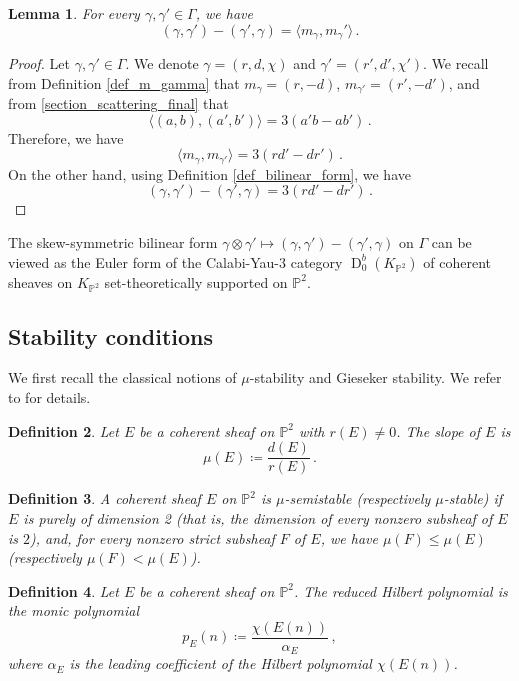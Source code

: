 \documentclass[12pt, a4paper]{amsart}
\newtheorem{defn}{Definition}[section]
\newtheorem{lem}[defn]{Lemma}
\newcommand\PP{\mathbb P}
\newcommand\D{\operatorname{D}}
\begin{document}
\begin{lem} \label{lem_skew_sym_euler_form}
For every $\gamma, \gamma' \in \Gamma$, we have 
\[ (\gamma,\gamma')-(\gamma',\gamma)
=\langle m_\gamma, m_\gamma' \rangle\,.\]
\end{lem}

\begin{proof}
Let $\gamma, \gamma' \in \Gamma$. We denote 
$\gamma=(r,d,\chi)$ and $\gamma'=(r',d',\chi')$. We recall from Definition
\ref{def_m_gamma} that $m_\gamma=(r,-d)$,
$m_{\gamma'}=(r',-d')$, and from
\cref{section_scattering_final} that 
\[\langle (a,b),(a',b')\rangle=3(a'b-ab')\,.\]
Therefore, we have 
\[\langle m_\gamma,m_{\gamma'}\rangle
=3(rd'-dr')\,.\]
On the other hand, using Definition \ref{def_bilinear_form}, we have 
\[ (\gamma,\gamma')-(\gamma',\gamma)
=3(rd'-dr')\,.\]
\end{proof}

The skew-symmetric bilinear form $\gamma \otimes \gamma' \mapsto (\gamma,\gamma')-(\gamma',\gamma)$
on $\Gamma$ can be viewed as the Euler form of the Calabi-Yau-3 category $\D^b_0(K_{\PP^2})$ of coherent sheaves on $K_{\PP^2}$ set-theoretically 
supported on $\PP^2$.


\subsection{Stability conditions}
\label{section_stability_conditions}

We first recall the classical notions of 
$\mu$-stability and Gieseker stability.
We refer to \cite{huybrechts2010geometry}
for details.

\begin{defn}
Let $E$ be a coherent sheaf on $\PP^2$ with $r(E) \neq 0$. The 
\emph{slope} of $E$ is 
\[ \mu(E) \coloneq \frac{d(E)}{r(E)}
\,.\]
\end{defn}

\begin{defn}
A coherent sheaf $E$ on $\PP^2$ is \emph{$\mu$-semistable} (respectively \emph{$\mu$-stable}) if
$E$ is purely of dimension 2 (that is, the dimension of every nonzero subsheaf of $E$ is $2$), and, for every nonzero strict subsheaf $F$ of $E$, we have $\mu(F) \leqslant \mu(E)$
(respectively $\mu(F)<\mu(E)$).
\end{defn}

\begin{defn}
Let $E$ be a coherent sheaf on $\PP^2$. The reduced Hilbert polynomial is the monic polynomial
\[ p_E(n) \coloneq \frac{\chi(E(n))}{\alpha_E} \,,\]
where $\alpha_E$ is the leading coefficient of the Hilbert polynomial 
$\chi(E(n))$.
\end{defn}
\end{document}
